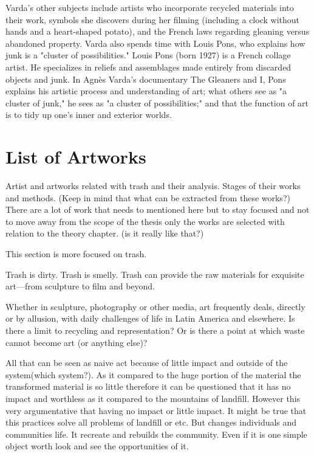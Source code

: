Varda's other subjects include artists who incorporate recycled materials into their work, symbols she discovers during her filming (including a clock without hands and a heart-shaped potato), and the French laws regarding gleaning versus abandoned property. Varda also spends time with Louis Pons, who explains how junk is a "cluster of possibilities." Louis Pons (born 1927) is a French collage artist. He specializes in reliefs and assemblages made entirely from discarded objects and junk. In Agnès Varda's documentary The Gleaners and I, Pons explains his artistic process and understanding of art; what others see as "a cluster of junk," he sees as "a cluster of possibilities;" and that the function of art is to tidy up one's inner and exterior worlds.

\section{List of Artworks}
Artist and artworks related with trash and their analysis. Stages of their works and methods. (Keep in mind that what can be extracted from these works?) There are a lot of work that needs to mentioned here but to stay focused and not to move away from the scope of the thesis only the works are selected with relation to the theory chapter. (is it really like that?) 

This section is more focused on trash.

Trash is dirty. Trash is smelly. Trash can provide the raw materials for exquisite art---from sculpture to film and beyond.

Whether in sculpture, photography or other media, art frequently deals, directly or by allusion, with daily challenges of life in Latin America and elsewhere. Is there a limit to recycling and representation? Or is there a point at which waste cannot become art (or anything else)?

All that can be seen as naive act because of little impact and outside of the system(which system?). As it compared to the huge portion of the material the transformed material is so little therefore it can be questioned that it has no impact and worthless as it compared to the mountains of landfill. However this very argumentative that having no impact or little impact. It might be true that this practices solve all problems of landfill or etc. But changes individuals and communities life. It recreate and rebuilds the community. Even if it is one simple object worth look and see the opportunities of it. 

